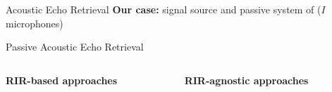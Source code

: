 \begin{frame}[t]{Acoustic Echo Retrieval \hfill\faPalette}
    \vfill
    \textcolor{myred}{\textbf{Our case:} signal source and passive system of ($I$ microphones)}

\end{frame}

\begin{frame}[t]{\alert{Passive} Acoustic Echo Retrieval \hfill\faPalette}

        \vspace{.5em}
        \begin{columns}[T,onlytextwidth] %
            \begin{column}{.48\textwidth}
                \textbf{RIR-\alert{based} approaches}
            \end{column}
            \begin{column}{.48\textwidth}
                \textbf{RIR-\alert{agnostic} approaches}
            \end{column}%
        \end{columns}


\end{frame}
